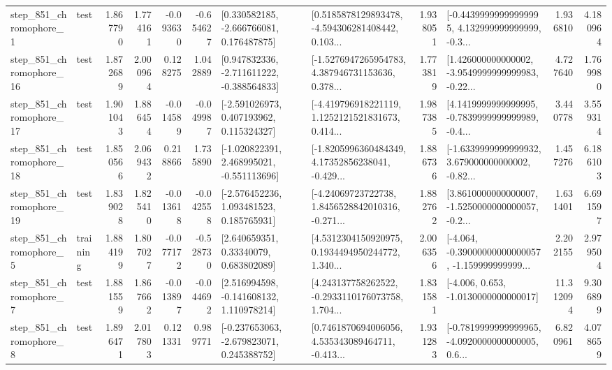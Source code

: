 \begin{tabular}{llrrrrllrlrr}
   step\_851\_chromophore\_1 &      test &      1.867790 &    1.774161 &     -0.093630 & -0.654627 &    [0.330582185, -2.666766081, 0.176487875] &  [0.5185878129893478, -4.594306281408442, 0.103... &       1.938051 &  [-0.44399999999999995, 4.132999999999999, -0.3... &            1.936810 &          4.180964 \\
  step\_851\_chromophore\_16 &      test &      1.872689 &    2.000964 &      0.128275 &  1.042889 &   [0.947832336, -2.711611222, -0.388564833] &  [-1.5276947265954783, 4.387946731153636, 0.378... &       1.773819 &  [1.426000000000002, -3.9549999999999983, -0.22... &            4.727640 &          1.769980 \\
  step\_851\_chromophore\_17 &      test &      1.901043 &    1.886454 &     -0.014589 & -0.049987 &    [-2.591026973, 0.407193962, 0.115324327] &  [-4.419796918221119, 1.1252121521831673, 0.414... &       1.987385 &  [4.1419999999999995, -0.7839999999999989, -0.4... &            3.440778 &          3.559314 \\
  step\_851\_chromophore\_18 &      test &      1.850566 &    2.069432 &      0.218866 &  1.735890 &   [-1.020822391, 2.468995021, -0.551113696] &  [-1.8205996360484349, 4.17352856238041, -0.429... &       1.886736 &  [-1.6339999999999932, 3.679000000000002, -0.82... &            1.457276 &          6.186103 \\
  step\_851\_chromophore\_19 &      test &      1.839028 &    1.825410 &     -0.013618 & -0.042558 &    [-2.576452236, 1.093481523, 0.185765931] &  [-4.24069723722738, 1.8456528842010316, -0.271... &       1.882762 &  [3.8610000000000007, -1.5250000000000057, -0.2... &            1.631401 &          6.691597 \\
   step\_851\_chromophore\_5 &  training &      1.884199 &    1.807027 &     -0.077172 & -0.528730 &      [2.640659351, 0.33340079, 0.683802089] &  [4.5312304150920975, 0.1934494950244772, 1.340... &       2.006356 &  [-4.064, -0.39000000000000057, -1.159999999999... &            2.202155 &          2.979504 \\
   step\_851\_chromophore\_7 &      test &      1.881559 &    1.867662 &     -0.013897 & -0.044692 &    [2.516994598, -0.141608132, 1.110978214] &  [4.243137758262522, -0.2933110176073758, 1.704... &       1.831581 &               [-4.006, 0.653, -1.0130000000000017] &           11.312094 &          9.306899 \\
   step\_851\_chromophore\_8 &      test &      1.896471 &    2.017803 &      0.121331 &  0.989771 &   [-0.237653063, -2.679823071, 0.245388752] &  [0.7461870694006056, 4.535343089464711, -0.413... &       1.931283 &  [-0.7819999999999965, -4.0920000000000005, 0.6... &            6.820961 &          4.078659 \\

\end{tabular}
